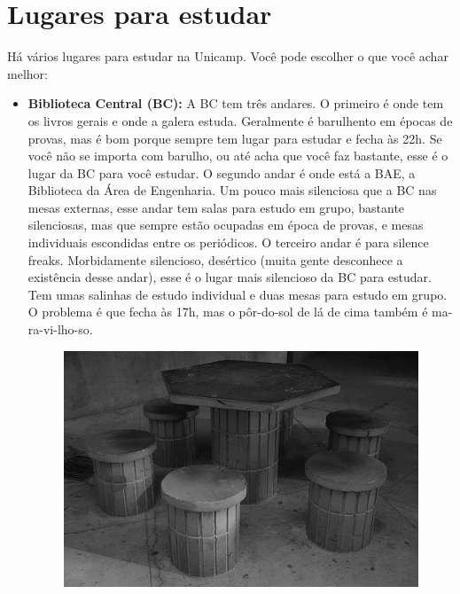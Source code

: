 \newpage
\section{Lugares para estudar}

Há vários lugares para estudar na Unicamp. Você pode escolher o que você achar
melhor:

\begin{itemize}
    \item  \textbf{Biblioteca Central (BC):} A BC tem três andares. O primeiro
    é onde tem os livros gerais e onde a galera estuda. Geralmente é barulhento em
    épocas de provas, mas é bom porque sempre tem lugar para estudar e fecha às 22h.
    Se você não se importa com barulho, ou até acha que você faz bastante, esse
    é o lugar da BC para você estudar. O segundo andar é onde está a BAE,
    a Biblioteca da Área de Engenharia. Um pouco mais silenciosa que a BC nas mesas
    externas, esse andar tem salas para estudo em grupo, bastante silenciosas, mas
    que sempre estão ocupadas em época de provas, e mesas individuais escondidas
    entre os periódicos. O terceiro andar é para silence freaks. Morbidamente
    silencioso, desértico (muita gente desconhece a existência desse andar), esse
    é o lugar mais silencioso da BC para estudar. Tem umas salinhas de estudo
    individual e duas mesas para estudo em grupo. O problema é que fecha às 17h, mas
    o pôr-do-sol de lá de cima também é ma-ra-vi-lho-so.

    \begin{figure}[h!]
        \centering
        \includegraphics[scale=0.60, keepaspectratio=true]{img/imgs/11-lugares_estudar/-072.jpg}
    \end{figure}


\end{itemize}
